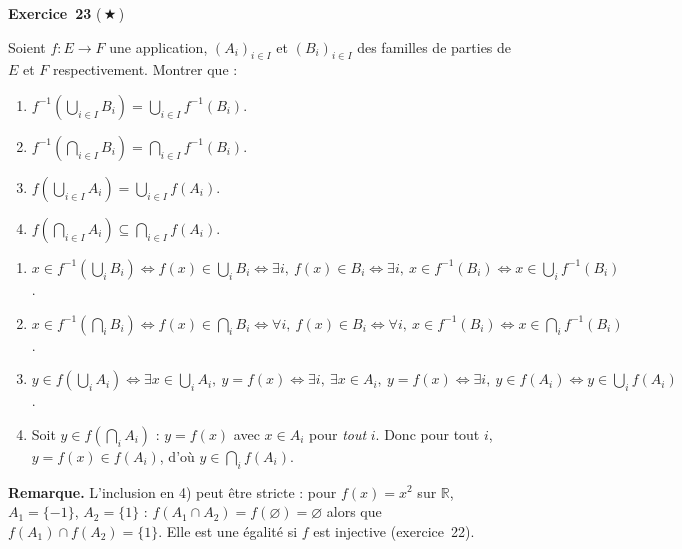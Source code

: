 \documentclass[11pt,a4paper]{article}
\newcommand{\R}{\mathbb{R}}\newcommand{\N}{\mathbb{N}}\newcommand{\Z}{\mathbb{Z}}
\newcommand{\rem}[1]{\par\smallskip\noindent\textbf{Remarque.} #1}
\begin{document}
	\medskip\noindent\textbf{\Large\color{bleu}Exercice~23} \textnormal{(\,$\bigstar$\,)}\nopagebreak
	\begin{enonce}
		Soient $f:E\to F$ une application, $(A_i)_{i\in I}$ et
		$(B_i)_{i\in I}$ des familles de parties de $E$ et $F$
		respectivement. Montrer que :
		
		\begin{enumerate}
			\item
			$
			f^{-1}\left(\bigcup_{i\in I}B_i\right)
			=\bigcup_{i\in I}f^{-1}(B_i).
			$
			
			\item
			$
			f^{-1}\left(\bigcap_{i\in I}B_i\right)
			=\bigcap_{i\in I}f^{-1}(B_i).
			$
			\item
			$
			f\left(\bigcup_{i\in I}A_i\right)
			=\bigcup_{i\in I}f(A_i).
			$
			
			\item
			$
			f\left(\bigcap_{i\in I}A_i\right)
			\subseteq\bigcap_{i\in I}f(A_i).
			$
		\end{enumerate}
	\end{enonce}
	\begin{corrige}
		\begin{enumerate}
			\item $x\in f^{-1}(\bigcup_iB_i)\iff f(x)\in\bigcup_iB_i\iff\exists i,\ f(x)\in B_i\iff\exists i,\ x\in f^{-1}(B_i)\iff x\in\bigcup_if^{-1}(B_i)$.
			\item $x\in f^{-1}(\bigcap_iB_i)\iff f(x)\in\bigcap_iB_i\iff\forall i,\ f(x)\in B_i\iff\forall i,\ x\in f^{-1}(B_i)\iff x\in\bigcap_if^{-1}(B_i)$.
			\item $y\in f(\bigcup_iA_i)\iff\exists x\in\bigcup_iA_i,\ y=f(x)\iff\exists i,\ \exists x\in A_i,\ y=f(x)\iff\exists i,\ y\in f(A_i)\iff y\in\bigcup_if(A_i)$.
			\item Soit $y\in f(\bigcap_iA_i)$ : $y=f(x)$ avec $x\in A_i$ pour \emph{tout} $i$. Donc pour tout $i$, $y=f(x)\in f(A_i)$, d'où $y\in\bigcap_if(A_i)$.
		\end{enumerate}
		\rem{L'inclusion en 4) peut être stricte : pour $f(x)=x^2$ sur $\R$, $A_1=\{-1\}$, $A_2=\{1\}$ : $f(A_1\cap A_2)=f(\varnothing)=\varnothing$ alors que $f(A_1)\cap f(A_2)=\{1\}$. Elle est une égalité si $f$ est injective (exercice~22).}
	\end{corrige}
	
\end{document}

